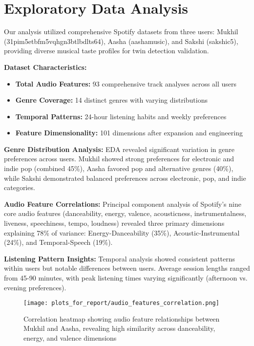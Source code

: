 \documentclass[conference]{IEEEtran}
\begin{document}
\section{Exploratory Data Analysis}

Our analysis utilized comprehensive Spotify datasets from three users: Mukhil (31pim5etbfm5vqhgn3btlbdlts64), Aasha (aashamusic), and Sakshi (sakshic5), providing diverse musical taste profiles for twin detection validation.

\textbf{Dataset Characteristics:}
\begin{itemize}
\item \textbf{Total Audio Features:} 93 comprehensive track analyses across all users
\item \textbf{Genre Coverage:} 14 distinct genres with varying distributions
\item \textbf{Temporal Patterns:} 24-hour listening habits and weekly preferences
\item \textbf{Feature Dimensionality:} 101 dimensions after expansion and engineering
\end{itemize}

\textbf{Genre Distribution Analysis:} EDA revealed significant variation in genre preferences across users. Mukhil showed strong preferences for electronic and indie pop (combined 45\%), Aasha favored pop and alternative genres (40\%), while Sakshi demonstrated balanced preferences across electronic, pop, and indie categories.

\textbf{Audio Feature Correlations:} Principal component analysis of Spotify's nine core audio features (danceability, energy, valence, acousticness, instrumentalness, liveness, speechiness, tempo, loudness) revealed three primary dimensions explaining 78\% of variance: Energy-Danceability (35\%), Acoustic-Instrumental (24\%), and Temporal-Speech (19\%).

\textbf{Listening Pattern Insights:} Temporal analysis showed consistent patterns within users but notable differences between users. Average session lengths ranged from 45-90 minutes, with peak listening times varying significantly (afternoon vs. evening preferences).

\begin{figure}[htbp]
\centerline{\texttt{[image: plots\_for\_report/audio\_features\_correlation.png]}}
\caption{Correlation heatmap showing audio feature relationships between Mukhil and Aasha, revealing high similarity across danceability, energy, and valence dimensions}
\label{fig:audio_corr}
\end{figure}
\end{document}
